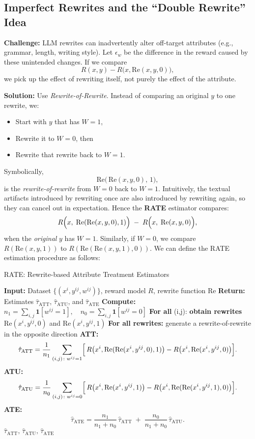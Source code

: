 \documentclass{article}
\theoremstyle{definition}
\begin{document}
\subsection{Imperfect Rewrites and the ``Double Rewrite'' Idea}

\textbf{Challenge:} LLM rewrites can inadvertently alter off-target attributes (e.g., grammar, length, writing style). Let $\epsilon_w$ be the difference in the reward caused by these unintended changes. If we compare
\[
R(x, y) - R\bigl(x, \text{Re}(x,y,0)\bigr),
\]
we pick up the effect of rewriting itself, not purely the effect of the attribute.

\textbf{Solution:} Use \emph{Rewrite-of-Rewrite}. Instead of comparing an original $y$ to one rewrite, we:
\begin{itemize}
    \item Start with $y$ that has $W=1$,
    \item Rewrite it to $W=0$, then
    \item Rewrite that rewrite back to $W=1$.
\end{itemize}
Symbolically, 
\[
\text{Re}\bigl(\,\text{Re}(x,y,0),\,1\bigr),
\]
is the \emph{rewrite-of-rewrite} from $W=0$ back to $W=1$. Intuitively, the textual artifacts introduced by rewriting once are also introduced by rewriting again, so they can cancel out in expectation. Hence the \textbf{RATE} estimator compares:
\[
R\Bigl(x,\;\text{Re}(\text{Re}(x,y,0),1)\Bigr) \;-\;
R\Bigl(x,\;\text{Re}(x,y,0)\Bigr),
\]
when the \emph{original} $y$ has $W=1$. Similarly, if $W=0$, we compare $R(\text{Re}(x,y,1))$ to $R(\text{Re}(\text{Re}(x,y,1),0))$. We can define the RATE estimation procedure as follows:
\begin{algorithm}[H]
  \caption{RATE: Rewrite-based Attribute Treatment Estimators}
  \label{alg:rate}
  \begin{algorithmic}[1]
  \State \textbf{Input:} Dataset $\{(x^i, y^{ij}, w^{ij})\}$, reward model $R$, rewrite function $\text{Re}$
  \State \textbf{Return:} Estimates $\hat{\tau}_{\text{ATT}}$, $\hat{\tau}_{\text{ATU}}$, and $\hat{\tau}_{\text{ATE}}$
  \State \textbf{Compute:} $n_1 = \sum_{i,j} \mathbf{1}[w^{ij}=1], \quad n_0 = \sum_{i,j} \mathbf{1}[w^{ij}=0]$
  \State \textbf{For all }(i,j): \textbf{obtain rewrites} $\text{Re}(x^i, y^{ij}, 0)$ and $\text{Re}(x^i, y^{ij}, 1)$
  \State \textbf{For all rewrites:} generate a rewrite-of-rewrite in the opposite direction
  \State \textbf{ATT:}
  \[
    \hat{\tau}_{\text{ATT}} = \frac{1}{n_1} \sum_{(i,j)\colon w^{ij}=1} \Bigl[\,R\bigl(x^i, \text{Re}(\text{Re}(x^i, y^{ij},0),1)\bigr) - R\bigl(x^i,\text{Re}(x^i, y^{ij},0)\bigr)\Bigr].
  \]
  \State \textbf{ATU:}
  \[
    \hat{\tau}_{\text{ATU}} = \frac{1}{n_0} \sum_{(i,j)\colon w^{ij}=0} \Bigl[\,R\bigl(x^i, \text{Re}(x^i, y^{ij},1)\bigr) - R\bigl(x^i,\text{Re}(\text{Re}(x^i, y^{ij},1),0)\bigr)\Bigr].
  \]
  \State \textbf{ATE: }
  \[
    \hat{\tau}_{\text{ATE}} = 
    \frac{n_1}{n_1+n_0}\,\hat{\tau}_{\text{ATT}}
    \;+\;
    \frac{n_0}{n_1+n_0}\,\hat{\tau}_{\text{ATU}}.
  \]
  \State \Return $\hat{\tau}_{\text{ATT}}, \,\hat{\tau}_{\text{ATU}}, \,\hat{\tau}_{\text{ATE}}$
  \end{algorithmic}
\end{algorithm}
\end{document}
